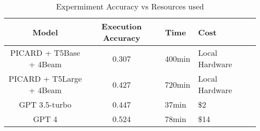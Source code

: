 \begin{table}[!ht]
    \centering
    \begin{tabular}{|c|c|c|L|L|}
        \hline
        Model                    & \textbf{Execution Accuracy} & \textbf{Time} & \textbf{Cost}  \\ \hline
        PICARD + T5Base + 4Beam  & 0.307                       & ~400min       & Local Hardware \\ \hline
        PICARD + T5Large + 4Beam & 0.427                       & ~720min       & Local Hardware \\ \hline
        GPT 3.5-turbo            & 0.447                       & 37min         & \$2            \\ \hline
        GPT 4                    & 0.524                       & 78min         & \$14           \\ \hline
    \end{tabular}
    \caption{Expermiment Accuracy vs Resources used}
\end{table}
